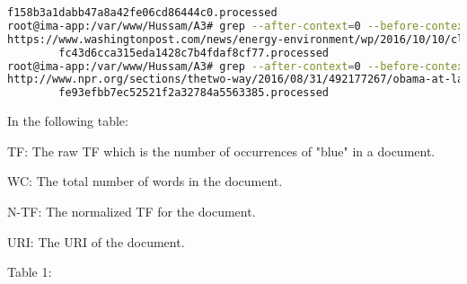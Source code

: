 \documentclass[a4paper, 11pt]{article}
\begin{document}
\begin{lstlisting}[language=bash, breakatwhitespace=〈false), label=Matching file names to URIs, caption= Matching file names to URIs:]
        f158b3a1dabb47a8a42fe06cd86444c0.processed
root@ima-app:/var/www/Hussam/A3# grep --after-context=0 --before-context=1 "fc43d6cca315eda1428c7b4fdaf8cf77.processed" map.txt
https://www.washingtonpost.com/news/energy-environment/wp/2016/10/10/climate-change-has-been-making-western-forest-fires-worse-for-decades-study-says/?source=socnet_tw_cc_20161027_bo_energy-environment_climate_5&utm_medium=social&utm_source=tw_bo&utm_campaign=socnet_tw_cc_20161027_bo_energy-environment_climate_5&utm_content=20161027_bo_energy-environment_climate_5
        fc43d6cca315eda1428c7b4fdaf8cf77.processed
root@ima-app:/var/www/Hussam/A3# grep --after-context=0 --before-context=1 "fe93efbb7ec52521f2a32784a5563385.processed" map.txt
http://www.npr.org/sections/thetwo-way/2016/08/31/492177267/obama-at-lake-tahoe-praises-conservation-efforts?source=socnet_tw_cc_20160906_bo_npr-article_conservation_2&utm_medium=socnet&utm_source=tw&utm_campaign=socnet_tw_cc_20160906_bo_npr-article_conservation_2&utm_content=20160906_bo_npr-article_conservation_2
        fe93efbb7ec52521f2a32784a5563385.processed
\end{lstlisting}

In the following table:

TF: The raw TF which is the number of occurrences of "blue" in a document.

WC: The total number of words in the document.

N-TF: The normalized TF for the document.

URI: The URI of the document.

Table 1:
\end{document}
